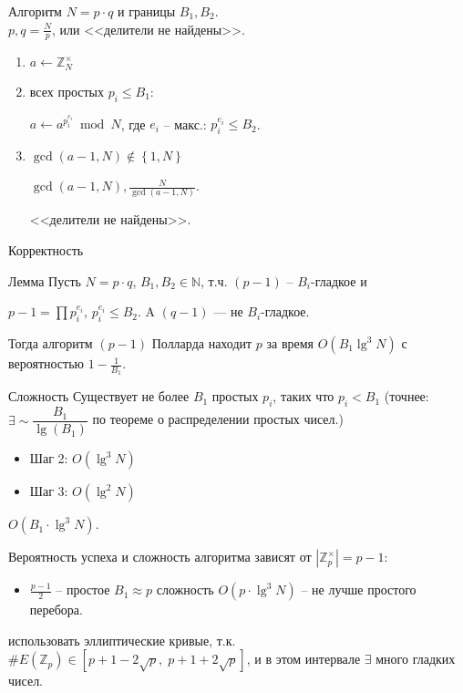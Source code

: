 \documentclass{beamer}
\begin{document}
\begin{frame}{Алгоритм}
 $N = p \cdot q$ и границы $B_1, B_2$.\\
 $p,q = \frac{N}{p}$, или <<делители не найдены>>.
    \begin{enumerate}
        \item $
        a\mathop  \leftarrow \mathbb{Z}_N^\times$
        \item {} всех простых ${p_i} \leqslant {B_1}$:
        
        \quad $a \leftarrow a^{p_i^{e_i}}\bmod N$, где $e_i$ -- макс.: $p_i^{e_i} \leqslant {B_2}$.
        
        \item {} $\gcd (a-1, N) \not  \in \left\{ {1,N} \right\}$
        
        \quad {} $\gcd (a-1, N), \frac{N}{\gcd (a-1, N)}$. 
        
        
        \quad {} <<делители не найдены>>.
    \end{enumerate}
\end{frame}

\begin{frame}{Корректность}
\begin{block}{Лемма}
    Пусть $N = p \cdot q$, $B_1,B_2 \in \mathbb{N}$, т.ч. $(p- 1)$ -- $B_i$-гладкое и 
    
    $p - 1 = \prod p_i^{e_i}$, $p_i^{e_i} \leqslant B_2$. A $(q-1)$ — не $B_i$-гладкое. 
    
    Тогда алгоритм $(p-1)$ Полларда находит $p$ за время $O( B_1 \lg^3 N)$ с вероятностью $1  - \frac{1}{B_1}$.
\end{block}
\end{frame}

\begin{frame}{Сложность}
Существует не более $B_1$ простых $p_i$, таких что $p_i < B_1$ (точнее: $\exists \sim \dfrac{B_1}{\lg ( B_1 )}$ по теореме о распределении простых чисел.)
\begin{itemize}
    \item Шаг 2: $O( \lg^3 N )$
    \item Шаг 3: $O( \lg^2 N )$
\end{itemize}
 $O( B_1 \cdot \lg^3 N )$.
\end{frame}

\begin{frame}
 Вероятность успеха и сложность алгоритма зависят от $|\mathbb{Z}_p^\times| = p - 1:$ \\
\begin{itemize}
    \item $\frac{p - 1}{2}$ -- простое \structure{$\Rightarrow$} $ {B_1} \approx p$ \structure{$\Rightarrow$} сложность $O( p \cdot \lg^3 N )$ -- не лучше простого перебора.
\end{itemize}

 использовать эллиптические кривые, т.к.  $\# E( \mathbb{Z}_p ) \in [ p + 1 - 2\sqrt p ,\;p + 1 + 2\sqrt p ]$, и в этом интервале $\exists$ много гладких чисел. 
\end{frame}
\end{document}
